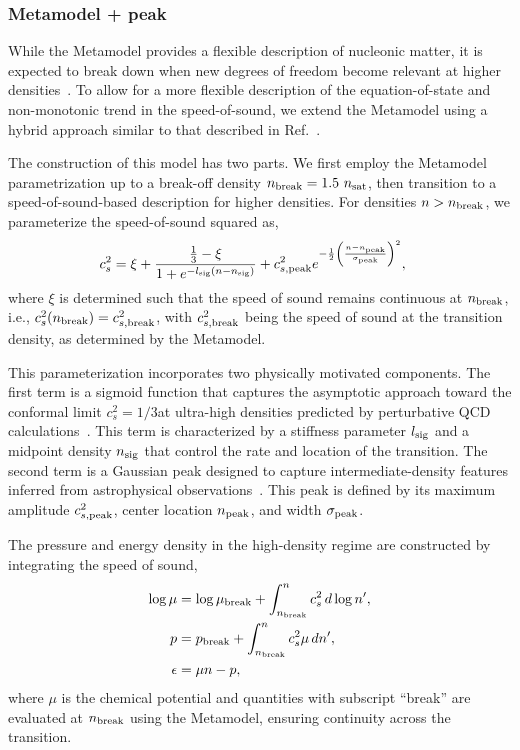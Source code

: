 \documentclass[prd,twocolumn,a4paper,floatfix,nofootinbib,preprintnumbers,superscriptaddress]{revtex4-1}
\begin{document}
\subsubsection{Metamodel + peak}
While the Metamodel provides a flexible description of nucleonic matter, it is expected to break down when new degrees of freedom become relevant at higher densities~\cite{Lattimer:2006qiu, Oertel:2016xsn, Kumar:2023lhv}. To allow for a more flexible description of the equation-of-state and non-monotonic trend in the speed-of-sound, we extend the Metamodel using a hybrid approach similar to that described in Ref.~\cite{Greif:2018njt}.

The construction of this model has two parts. We first employ the Metamodel parametrization up to a break-off density $n_{\rm break} = 1.5 \ n_{\rm sat}$, then transition to a speed-of-sound-based description for higher densities. For densities $n > n_{\rm break}$, we parameterize the speed-of-sound squared as,
\begin{equation}
\begin{aligned}
    c^2_s &= \xi + \frac{\frac{1}{3} - \xi}{1 + e^{-l_{\rm sig}(n - n_{\rm sig})}} + c^2_{s,{\rm peak}}e^{-\frac{1}{2}\left(\frac{n - n_{\rm peak}}{\sigma_{\rm peak}}\right)^2},
\end{aligned}
\label{eq:peakCSE}
\end{equation}
where $\xi$ is determined such that the speed of sound remains continuous at $n_{\rm break}$, i.e., $c^2_s(n_{\rm break}) = c^2_{s, {\rm break}}$, with $c^2_{s, {\rm break}}$ being the speed of sound at the transition density, as determined by the Metamodel.

This parameterization incorporates two physically motivated components. The first term is a sigmoid function that captures the asymptotic approach toward the conformal limit $c^2_s=1/3$at ultra-high densities predicted by perturbative QCD calculations~\cite{Gorda:2018gpy, Gorda:2021znl, Gorda:2023mkk}. This term is characterized by a stiffness parameter $l_{\rm sig}$ and a midpoint density $n_{\rm sig}$ that control the rate and location of the transition. The second term is a Gaussian peak designed to capture intermediate-density features inferred from astrophysical observations~\cite{Legred:2021hdx, Huth:2021bsp, Pang:2021jta, Altiparmak:2022bke, Pang:2023dqj, Koehn:2024set}. This peak is defined by its maximum amplitude $c^2_{s,{\rm peak}}$, center location $n_{\rm peak}$, and width $\sigma_{\rm peak}$.

The pressure and energy density in the high-density regime are constructed by integrating the speed of sound,
\begin{equation}
\begin{aligned}
  \log\mu &= \log\mu_{\rm break} + \int^n_{n_{\rm break}} c^2_s \, d\log n',\\
  p &= p_{\rm break} + \int^n_{n_{\rm break}} c^2_s \mu \, dn',\\
  \epsilon &= \mu n - p,
\end{aligned}
\end{equation}
where $\mu$ is the chemical potential and quantities with subscript ``break'' are evaluated at $n_{\rm break}$ using the Metamodel, ensuring continuity across the transition.
\end{document}
